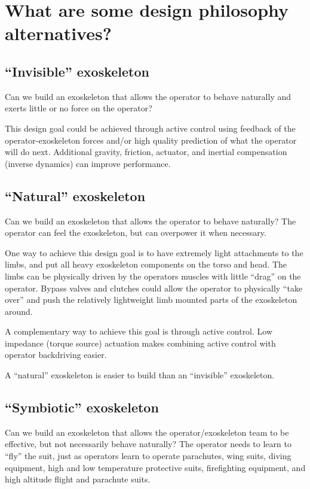 \section{What are some design philosophy alternatives?}

\subsection{``Invisible'' exoskeleton}

Can we build an exoskeleton that allows the operator to behave naturally
and exerts little or no force on the operator?

This design goal
could be achieved through active control using feedback of the
operator-exoskeleton forces and/or high quality prediction of what
the operator will do next. Additional gravity, friction, actuator, and
inertial compensation (inverse dynamics) can improve performance.

\subsection{``Natural'' exoskeleton}

Can we build an exoskeleton that allows the operator to behave naturally?
The operator can feel the exoskeleton, but can overpower it when necessary.

One way to achieve this design goal is to have extremely light attachments
to the limbs, and put all heavy exoskeleton components on the
torso and head. The limbs can be physically driven by the operators muscles
with little ``drag'' on the operator.
Bypass valves and clutches could allow the operator to physically ``take over''
and push the relatively lightweight limb mounted parts of the exoskeleton around.

A complementary way to achieve this goal is through active control. Low impedance
(torque source) actuation makes combining active control with operator backdriving
easier.

A ``natural'' exoskeleton is easier to build than 
an ``invisible'' exoskeleton.

\subsection{``Symbiotic'' exoskeleton}

Can we build an exoskeleton that allows the operator/exoskeleton team
to be effective, but not necessarily behave naturally? 
The operator needs to learn to ``fly'' the suit,
just as operators learn to operate parachutes,
wing suits, diving equipment, high and low temperature protective
suits, firefighting equipment, and high altitude flight
and parachute suits.

